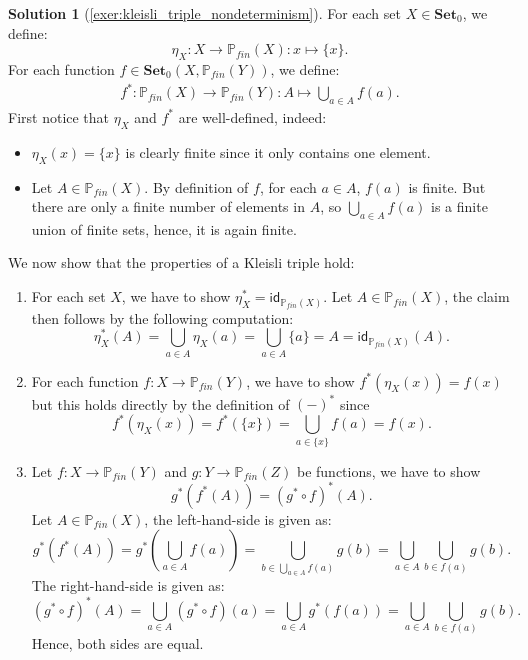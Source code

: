 \documentclass[a4paper,11pt, oneside,titlepage=false]{scrbook}
\theoremstyle{plain}
\theoremstyle{definition}
\newtheorem{solution}[thm]{Solution}
\newcommand{\cfont}[1]{\ensuremath{\mathsf{#1}}}
\newcommand{\Catb}[1]{\mathbf{#1}}
\newcommand{\SET}{\Catb{Set}}
\newcommand{\Ob}[1]{{#1}_0}
\newcommand{\CHom}[3]{{#1}(#2,#3)}
\newcommand{\Id}[1][]{\cfont{id}_{#1}}
\newcommand{\co}[2]{\ensuremath{#2 \circ #1}}
\begin{document}
\begin{solution}[\cref{exer:kleisli_triple_nondeterminism}]
  \label{sol:kleisli_triple_nondeterminism}
For each set $X\in\Ob \SET$, we define:
\[
\eta_X : X \to \mathbb{P}_{fin}(X) : x\mapsto \{x\}.
\]
For each function $f\in\CHom{\Ob \SET}{X}{\mathbb{P}_{fin}(Y)}$, we define:
\begin{align*}
f^{*} : \mathbb{P}_{fin}(X) \to \mathbb{P}_{fin}(Y) : A \mapsto \bigcup_{a\in A} f(a).
\end{align*}
First notice that $\eta_X$ and $f^{*}$ are well-defined, indeed:
\begin{itemize}
\item $\eta_X(x) = \{x\}$ is clearly finite since it only contains one element.
\item Let $A\in \mathbb{P}_{fin}(X)$. By definition of $f$, for each $a\in A$, $f(a)$ is finite. But there are only a finite number of elements in $A$, so $\bigcup_{a\in A} f(a)$ is a finite union of finite sets, hence, it is again finite.
\end{itemize}
We now show that the properties of a Kleisli triple hold:
\begin{enumerate}
\item For each set $X$, we have to show $\eta_X^{*} = \Id[\mathbb{P}_{fin}(X)]$. Let $A\in \mathbb{P}_{fin}(X)$, the claim then follows by the following computation:
\[
\eta_X^{*}(A) = \bigcup_{a\in A} \eta_X(a) = \bigcup_{a\in A} \{a\} = A = \Id[\mathbb{P}_{fin}(X)](A).
\]

\item For each function $f:X\to \mathbb{P}_{fin}(Y)$, we have to show $f^{*}(\eta_X(x)) = f(x)$ but this holds directly by the definition of $(-)^{*}$ since
\[
f^{*}(\eta_X(x)) = f^{*}(\{x\}) = \bigcup_{a\in \{x\}} f(a) = f(x).
\]

\item Let $f:X\to \mathbb{P}_{fin}(Y)$ and $g:Y\to \mathbb{P}_{fin}(Z)$ be functions, we have to show
\[
g^{*}(f^{*}(A)) = (\co{f}{g^{*}})^{*}(A).
\]
Let $A\in \mathbb{P}_{fin}(X)$, the left-hand-side is given as:
\[
g^{*}(f^{*}(A)) = g^{*}\left( \bigcup_{a\in A} f(a) \right) = \bigcup_{b \in \bigcup_{a\in A} f(a)} g(b) = \bigcup_{a\in A} \bigcup_{b\in f(a)} g(b).
\]
The right-hand-side is given as:
\[
(\co{f}{g^{*}})^{*}(A) = \bigcup_{a\in A} (\co{f}{g^{*}})(a) = \bigcup_{a\in A} g^{*}(f(a)) = \bigcup_{a\in A} \bigcup_{b\in f(a)} g(b).
\]
Hence, both sides are equal.

\end{enumerate}
\end{solution}
\end{document}
